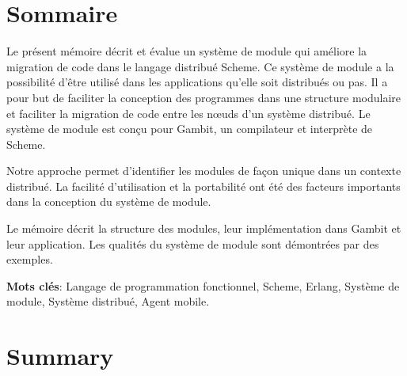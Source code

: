 \documentclass[12pt,initial,twoside,maitrise]{dms}
\numberwithin{equation}{section}
\numberwithin{table}{chapter}
\numberwithin{figure}{chapter}
\begin{document}
\maketitle



\francais{}

\chapter*{Sommaire}
Le présent mémoire décrit et évalue un système de module
qui améliore la migration de code dans le langage
distribué Scheme. Ce système de module a la possibilité
d'être utilisé dans les applications qu'elle soit distribués ou pas.
Il a pour but de faciliter
la conception des programmes dans une structure modulaire
et faciliter la migration de code entre les nœuds
d'un système distribué. Le système de module est conçu pour
Gambit, un compilateur et interprète de Scheme.

Notre approche permet d'identifier les modules
de façon unique dans un contexte distribué. La facilité
d'utilisation et la portabilité ont été des facteurs importants
dans la conception du système de module.

Le mémoire décrit la structure des modules, leur implémentation
dans Gambit et leur application. Les qualités du système de module sont
démontrées par des exemples.

\vspace*{1.5ex}
\noindent\textbf{Mots clés}: Langage de programmation fonctionnel,
Scheme, Erlang, Système de module, Système distribué, Agent mobile.


\anglais{}
\chapter*{Summary}
\end{document}
